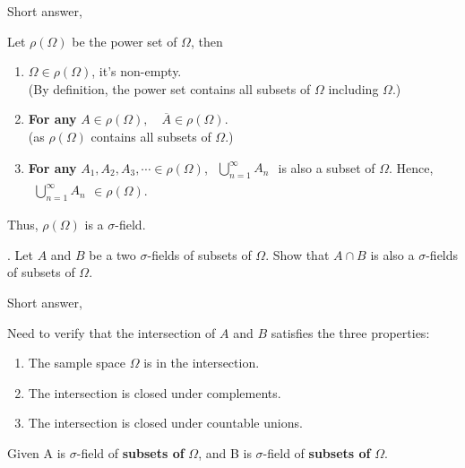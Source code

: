 \documentclass[12pt,thmsa]{article}
\begin{document}
\noindent
Short answer,

Let \(\rho(\Omega)\) be the power set of \(\Omega\), then
\begin{enumerate}[label=\roman*)] %
	\item \(\Omega \in \rho(\Omega)\), it's non-empty. \\
	(By definition, the power set contains all subsets of \(\Omega\) including \(\Omega\).)
	
	\item \textbf{For any} \(A \in \rho(\Omega), \quad \overline{A} \in \rho(\Omega)\). \\
	(as \(\rho(\Omega)\) contains all subsets of \(\Omega\).)
	\item \textbf{For any} \(A_{1}, A_{2}, A_{3}, \cdots \in \rho(\Omega)\), \(\begin{aligned}\bigcup_{n=1}^{\infty} A_{n}\end{aligned}\) is also a subset of \(\Omega\). Hence, \(\begin{aligned}\bigcup_{n=1}^{\infty} A_{n}\end{aligned} \in \rho(\Omega)\).
\end{enumerate}

Thus, \(\rho(\Omega)\) is a \(\sigma\)-field.

\medskip


. Let \(A\) and \(B\) be a two \(\sigma\)-fields of subsets of \(\Omega\). Show that \(A \cap B\) is also a \(\sigma\)-fields of
subsets of \(\Omega\).

\noindent
Short answer,

Need to verify that the intersection of \(A\) and \(B\) satisfies the three properties:
\begin{enumerate}[label=\roman*)] %
	\item The sample space \(\Omega\) is in the intersection.
	\item The intersection is closed under complements.
	\item The intersection is closed under countable unions.
\end{enumerate}

Given A is \(\sigma\)-field of \textbf{subsets of} \(\Omega\), and B is \(\sigma\)-field of \textbf{subsets of} \(\Omega\).
\end{document}
